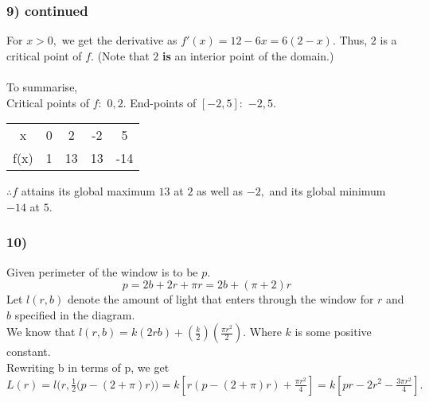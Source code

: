 \documentclass[handout]{beamer}
\begin{document}
\begin{frame}
    \frametitle{9) continued}
	For $x > 0,$ we get the derivative as $f'(x) = 12 - 6x = 6(2 - x).$ Thus, $2$ is a critical point of $f.$ (Note that $2$ \textbf{is} an interior point of the domain.)\\~\\
	To summarise,\\
	Critical points of $f:$ $0, 2.$ End-points of $[-2, 5]:$ $-2, 5.$\\
	\begin{center}
		\begin{tabular}{|c| c c c c|}
		\hline
		x & 0 & 2 & -2 & 5\\
		f(x) & 1 & 13 & 13 & -14 \\
		\hline
		\end{tabular}
	\end{center}
	$\therefore f$ attains its global maximum $13$ at $2$ as well as $-2,$ and its global minimum $-14$ at $5.$
\end{frame}
\begin{frame}
    \frametitle{10)}
	\begin{figure}
		\centering
	\end{figure}
Given perimeter of the window is to be $p$.
\[p = 2b+2r+\pi r = 2b + (\pi+2)r \]
Let $l(r, b)$ denote the amount of light that enters through the window for $r$ and $b$ specified in the diagram.\\
	We know that $l(r, b) = k(2rb) + \left(\frac{k}{2}\right)(\frac{\pi r^2}{2}).$ Where $k$ is some positive constant.\\
    Rewriting b in terms of p, we get 
    $L(r) = l\bigg(r, \frac{1}{2}\big(p - (2 + \pi)r\big)\bigg) = k\left[r(p - (2 + \pi)r) + \frac{\pi r^2}{4}\right] = k \left[pr - 2r^2 - \frac{3\pi r^2}{4}\right].$\\
\end{frame}
\end{document}
